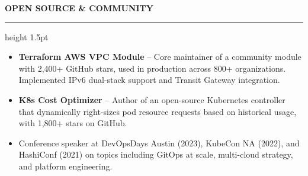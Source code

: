 \documentclass[11pt,a4paper]{article}
\newcommand{\sectionrule}{%
  \vspace{2pt}
  {\color{accent}\hrule height 1.5pt}
  \vspace{6pt}
}
\newcommand{\sectiontitle}[1]{%
  \vspace{10pt}
  {\normalsize\bfseries\color{primary}\MakeUppercase{#1}}
  \sectionrule
}
\begin{document}
\sectiontitle{Open Source \& Community}

\begin{itemize}
  \item \textbf{Terraform AWS VPC Module} -- Core maintainer of a community module with 2,400+ GitHub stars, used in production across 800+ organizations. Implemented IPv6 dual-stack support and Transit Gateway integration.
  \item \textbf{K8s Cost Optimizer} -- Author of an open-source Kubernetes controller that dynamically right-sizes pod resource requests based on historical usage, with 1,800+ stars on GitHub.
  \item Conference speaker at DevOpsDays Austin (2023), KubeCon NA (2022), and HashiConf (2021) on topics including GitOps at scale, multi-cloud strategy, and platform engineering.
\end{itemize}
\end{document}
